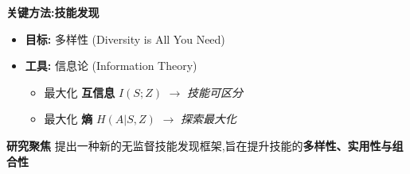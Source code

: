 \documentclass{beamer}
\begin{document}
\begin{frame}
\begin{columns}[T]
\begin{column}{0.5\textwidth}
            \textbf{关键方法:技能发现}
                \begin{itemize}
                    \item \textbf{目标:} 多样性 (Diversity is All You Need)
                    \item \textbf{工具:} 信息论 (Information Theory)
                    \begin{itemize}
                        \tiny
                        \item 最大化 \textbf{互信息} $I(S; Z)$ $\rightarrow$ \textit{技能可区分}
                        \item 最大化 \textbf{熵} $H(A|S, Z)$ $\rightarrow$ \textit{探索最大化}
                    \end{itemize}
                \end{itemize}
            
            \textbf{研究聚焦}
                提出一种新的无监督技能发现框架,旨在提升技能的\textbf{多样性、实用性与组合性}

         \end{column}
    \end{columns}

\end{frame}
\end{document}

